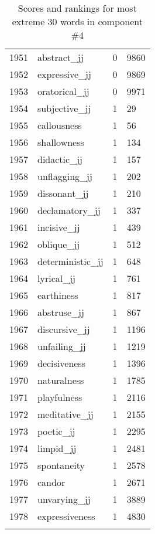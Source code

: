 \begin{longtable}[!htbp]{| rlr@{.}l |}
    1951 & abstract\_jj & 0 & 9860 \\
    1952 & expressive\_jj & 0 & 9869 \\
    1953 & oratorical\_jj & 0 & 9971 \\
    1954 & subjective\_jj & 1 & 29 \\
    1955 & callousness & 1 & 56 \\
    1956 & shallowness & 1 & 134 \\
    1957 & didactic\_jj & 1 & 157 \\
    1958 & unflagging\_jj & 1 & 202 \\
    1959 & dissonant\_jj & 1 & 210 \\
    1960 & declamatory\_jj & 1 & 337 \\
    1961 & incisive\_jj & 1 & 439 \\
    1962 & oblique\_jj & 1 & 512 \\
    1963 & deterministic\_jj & 1 & 648 \\
    1964 & lyrical\_jj & 1 & 761 \\
    1965 & earthiness & 1 & 817 \\
    1966 & abstruse\_jj & 1 & 867 \\
    1967 & discursive\_jj & 1 & 1196 \\
    1968 & unfailing\_jj & 1 & 1219 \\
    1969 & decisiveness & 1 & 1396 \\
    1970 & naturalness & 1 & 1785 \\
    1971 & playfulness & 1 & 2116 \\
    1972 & meditative\_jj & 1 & 2155 \\
    1973 & poetic\_jj & 1 & 2295 \\
    1974 & limpid\_jj & 1 & 2481 \\
    1975 & spontaneity & 1 & 2578 \\
    1976 & candor & 1 & 2671 \\
    1977 & unvarying\_jj & 1 & 3889 \\
    1978 & expressiveness & 1 & 4830 \\
    \hline
    \caption{Scores and rankings for most extreme 30 words in component \#4} \\
\end{longtable}
